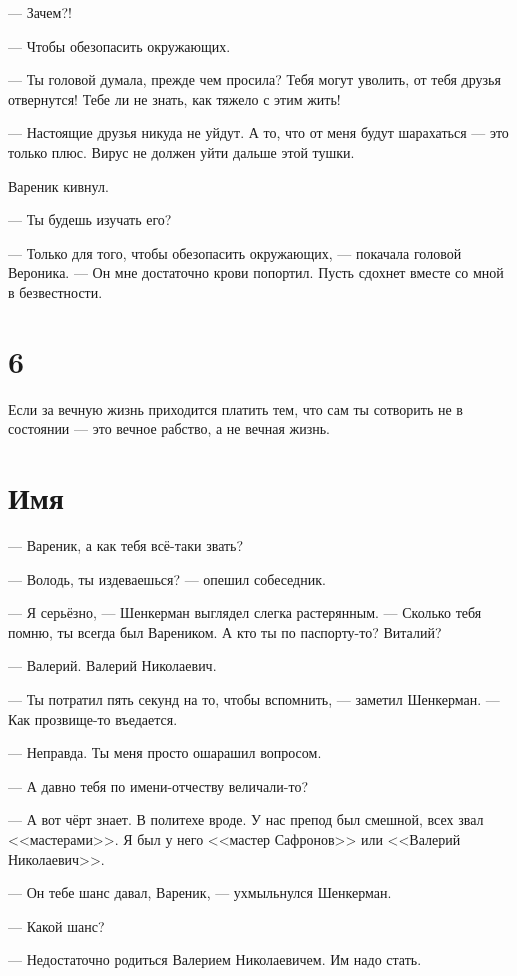 \documentclass[a4paper,10pt,fleqn]{book}\usepackage{polyglossia}\setdefaultlanguage{english}\setotherlanguage{russian}\defaultfontfeatures{Ligatures=TeX,Mapping=tex-text} \usepackage{xcolor}\definecolor{lightgray}{HTML}{bbbbbb}\color{lightgray}\newcommand{\ml}[3]{\textcolor{black}{#3}}
\begin{document}
--- Зачем?!

--- Чтобы обезопасить окружающих.

--- Ты головой думала, прежде чем просила?
Тебя могут уволить, от тебя друзья отвернутся!
Тебе ли не знать, как тяжело с этим жить!

--- Настоящие друзья никуда не уйдут.
А то, что от меня будут шарахаться --- это только плюс.
Вирус не должен уйти дальше этой тушки.

Вареник кивнул.

--- Ты будешь изучать его?

--- Только для того, чтобы обезопасить окружающих, --- покачала головой Вероника.
--- Он мне достаточно крови попортил.
Пусть сдохнет вместе со мной в безвестности.

\section{6}

Если за вечную жизнь приходится платить тем, что сам ты сотворить не в состоянии --- это вечное рабство, а не вечная жизнь.

\section{Имя}

--- Вареник, а как тебя всё-таки звать?

--- Володь, ты издеваешься? --- опешил собеседник.

--- Я серьёзно, --- Шенкерман выглядел слегка растерянным.
--- Сколько тебя помню, ты всегда был Вареником.
А кто ты по паспорту-то?
Виталий?

--- Валерий.
Валерий Николаевич.

--- Ты потратил пять секунд на то, чтобы вспомнить, --- заметил Шенкерман.
--- Как прозвище-то въедается.

--- Неправда.
Ты меня просто ошарашил вопросом.

--- А давно тебя по имени-отчеству величали-то?

--- А вот чёрт знает.
В политехе вроде.
У нас препод был смешной, всех звал <<мастерами>>.
Я был у него <<мастер Сафронов>> или <<Валерий Николаевич>>.

--- Он тебе шанс давал, Вареник, --- ухмыльнулся Шенкерман.

--- Какой шанс?

--- Недостаточно родиться Валерием Николаевичем.
Им надо стать.
\end{document}
